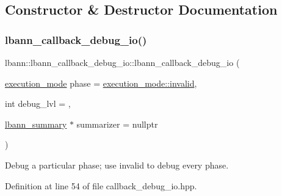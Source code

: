 \subsection{Constructor \& Destructor Documentation}
\mbox{\label{classlbann_1_1lbann__callback__debug__io_a4103f7a133e2e7a8afe8744fc9345e2c}} 
\subsubsection{\texorpdfstring{lbann\+\_\+callback\+\_\+debug\+\_\+io()}{lbann\_callback\_debug\_io()}\hspace{0.1cm}{\footnotesize\ttfamily [1/2]}}
{\footnotesize\ttfamily lbann\+::lbann\+\_\+callback\+\_\+debug\+\_\+io\+::lbann\+\_\+callback\+\_\+debug\+\_\+io (\begin{DoxyParamCaption}\item[{\hyperlink{base_8hpp_a2781a159088df64ed7d47cc91c4dc0a8}{execution\+\_\+mode}}]{phase = {\ttfamily \hyperlink{base_8hpp_a2781a159088df64ed7d47cc91c4dc0a8afedb2d84cafe20862cb4399751a8a7e3}{execution\+\_\+mode\+::invalid}},  }\item[{int}]{debug\+\_\+lvl = {},  }\item[{\hyperlink{classlbann_1_1lbann__summary}{lbann\+\_\+summary} $\ast$}]{summarizer = {\ttfamily nullptr} }\end{DoxyParamCaption})\hspace{0.3cm}{\ttfamily [inline]}}

Debug a particular phase; use invalid to debug every phase. 

Definition at line 54 of file callback\+\_\+debug\+\_\+io.\+hpp.


